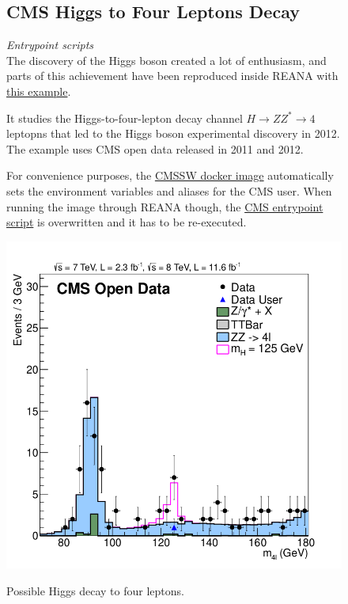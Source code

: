 \begin{figure}[H]
    \centering
    \begin{minipage}[H]{0.49\textwidth}
\subsection{CMS Higgs to Four Leptons Decay}
\vspace{-0.25em}
\textit{Entrypoint scripts}\\
The discovery of the Higgs boson \cite{Higgs_discovery} created a lot of enthusiasm, and parts of this achievement have been reproduced inside REANA with \href{https://github.com/reanahub/reana-demo-cms-h4l}{this example}.\\
\vspace{1em}

\noindent
It studies the Higgs-to-four-lepton decay channel $H \to ZZ^{*} \to 4$ leptopns that led to the Higgs boson experimental discovery in 2012. The example uses CMS open data released in 2011 and 2012.\\
\vspace{1em}

\noindent
For convenience purposes, the \href{https://hub.docker.com/r/cmsopendata/cmssw_5_3_32}{CMSSW docker image} automatically sets the environment variables and aliases for the CMS user. When running the image through REANA though, the \href{https://github.com/clelange/cmssw-docker/blob/master/standalone/entrypoint.sh}{CMS entrypoint script} is overwritten and it has to be re-executed.

     \end{minipage}
 \hfill
    \begin{minipage}[H]{0.49\textwidth}
        \centering
        \includegraphics[width=1.0\textwidth]{figures/cms_h4l.png}\\
        \caption{Possible Higgs decay to four leptons.}
        \label{fig:cms_h4l}
     \end{minipage}
\end{figure}




